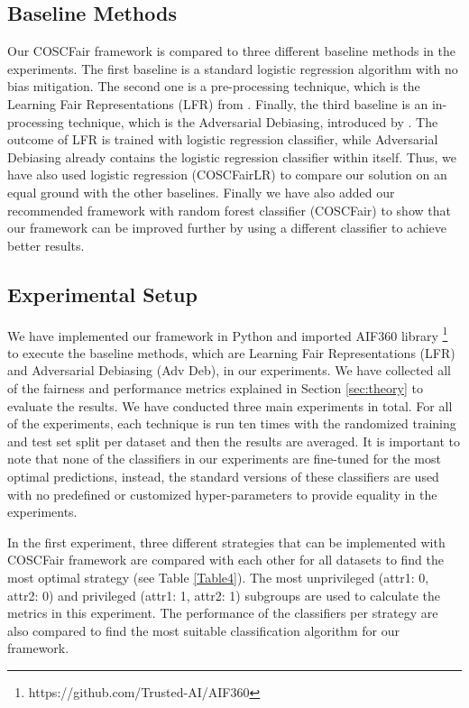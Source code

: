 \subsection{Baseline Methods}\label{ssec:baselines}

Our COSCFair framework is compared to three different baseline methods in the experiments. The first baseline is a standard logistic regression algorithm with no bias mitigation. The second one is a pre-processing technique, which is the Learning Fair Representations (LFR) from \citeauthor{zemel2013fair_learning} \cite{zemel2013fair_learning}. Finally, the third baseline is an in-processing technique, which is the Adversarial Debiasing, introduced by  \citeauthor{zhang2018adversarial} \cite{zhang2018adversarial}. The outcome of LFR is trained with logistic regression classifier, while Adversarial Debiasing already contains the logistic regression classifier within itself. Thus, we have also used logistic regression (COSCFairLR) to compare our solution on an equal ground with the other baselines. Finally we have also added our recommended framework with random forest classifier (COSCFair) to show that our framework can be improved further by using a different classifier to achieve better results.







\subsection{Experimental Setup}\label{sscec:expers}

We have implemented our framework in Python and imported AIF360 library \footnote{https://github.com/Trusted-AI/AIF360} to execute the baseline methods, which are Learning Fair Representations (LFR) and Adversarial Debiasing (Adv Deb), in our experiments. We have collected all of the fairness and performance metrics explained in Section \ref{sec:theory} to evaluate the results. We have conducted three main experiments in total. For all of the experiments, each technique is run ten times with the randomized training and test set split per dataset and then the results are averaged. It is important to note that none of the classifiers in our experiments are fine-tuned for the most optimal predictions, instead, the standard versions of these classifiers are used with no predefined or customized hyper-parameters to provide equality in the experiments.


In the first experiment, three different strategies that can be implemented with COSCFair framework are compared with each other for all datasets to find the most optimal strategy (see Table \ref{Table4}). The most unprivileged (attr1: 0, attr2: 0) and privileged (attr1: 1, attr2: 1) subgroups are used to calculate the metrics in this experiment. The performance of the classifiers per strategy are also compared to find the most suitable classification algorithm for our framework. 


